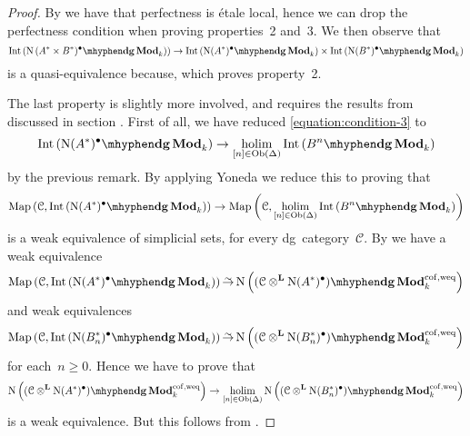 \begin{refsection}
\begin{theorem}
\begin{proof}[Proof]
    By \cite[corollary 1.3.7.4]{hagII} we have that perfectness is \'etale local, hence we can drop the perfectness condition when proving properties~2 and~3. We then observe that
    \begin{equation}
      \Int\left( \dgMod{\nerve\left( A^*\times B^*)^\bullet}_k \right) \right)\to\Int\left( \dgMod{\nerve(A^*)^\bullet}_k \right)\times\Int\left( \dgMod{\nerve(B^*)^\bullet}_k \right)
    \end{equation}
    is a quasi-equivalence because\expandthis, which proves property~2.

    The last property is slightly more involved, and requires the results from \cite{toen} discussed in section \addreference. First of all, we have reduced \eqref{equation:condition-3} to
    \begin{equation}
      \Int\left( \dgMod{\nerve(A^*)^\bullet}_k \right)\to\holim_{[n]\in\Ob(\Delta)}\Int\left( \dgMod{B^n}_k \right)
    \end{equation}
    by the previous remark. By applying Yoneda we reduce this to proving that
    \begin{equation}
      \Map\left( \mathcal{C},\Int\left( \dgMod{\nerve(A^*)^\bullet}_k \right) \right)\to\Map\left( \mathcal{C},\holim_{[n]\in\Ob(\Delta)}\Int\left( \dgMod{B^n}_k \right) \right)
    \end{equation}
    is a weak equivalence of simplicial sets, for every dg~category~$\mathcal{C}$. By \cite[theorem 4.2]{toen} we have a weak equivalence
    \begin{equation}
      \Map\left( \mathcal{C},\Int\left( \dgMod{\nerve(A^*)^\bullet}_k \right) \right)\weq\nerve\left( \dgMod{(\mathcal{C}\otimes^{\mathbf{L}}\nerve(A^*)^\bullet)}_k^{\mathrm{cof,weq}} \right)
    \end{equation}
    and weak equivalences
    \begin{equation}
      \Map\left( \mathcal{C},\Int\left( \dgMod{\nerve(B_n^*)^\bullet}_k \right) \right)\weq\nerve\left( \dgMod{(\mathcal{C}\otimes^{\mathbf{L}}\nerve(B_n^*)^\bullet)}_k^{\mathrm{cof,weq}} \right)
    \end{equation}
    for each~$n\geq 0$. Hence we have to prove that
    \begin{equation}
      \nerve\left( \dgMod{(\mathcal{C}\otimes^{\mathbf{L}}\nerve(A^*)^\bullet)}_k^{\mathrm{cof,weq}} \right)\to\holim_{[n]\in\Ob(\Delta)}\nerve\left( \dgMod{(\mathcal{C}\otimes^{\mathbf{L}}\nerve(B_n^*)^\bullet)}_k^{\mathrm{cof,weq}} \right)
    \end{equation}
    is a weak equivalence. But this follows from \addreference.
  \end{proof}
\end{theorem}


\end{refsection}
